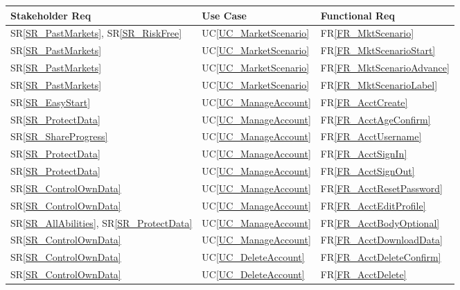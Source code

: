 \documentclass[12pt]{article}
\newcommand{\srref}[1]{SR\ref{#1}}
\newcommand{\ucref}[1]{UC\ref{#1}}
\newcommand{\rref}[1]{FR\ref{#1}}
\begin{document}
\begin{longtable}{p{} p{} p{}}

\toprule
Stakeholder Req & Use Case & Functional Req \\
\midrule

\srref{SR_PastMarkets}, \srref{SR_RiskFree} & \ucref{UC_MarketScenario} & \rref{FR_MktScenario} \\
\srref{SR_PastMarkets} & \ucref{UC_MarketScenario} & \rref{FR_MktScenarioStart} \\
\srref{SR_PastMarkets} & \ucref{UC_MarketScenario} & \rref{FR_MktScenarioAdvance} \\
\srref{SR_PastMarkets} & \ucref{UC_MarketScenario} & \rref{FR_MktScenarioLabel} \\
\srref{SR_EasyStart} & \ucref{UC_ManageAccount} & \rref{FR_AcctCreate} \\
\srref{SR_ProtectData} & \ucref{UC_ManageAccount} & \rref{FR_AcctAgeConfirm} \\
\srref{SR_ShareProgress} & \ucref{UC_ManageAccount} & \rref{FR_AcctUsername} \\
\srref{SR_ProtectData} & \ucref{UC_ManageAccount} & \rref{FR_AcctSignIn} \\
\srref{SR_ProtectData} & \ucref{UC_ManageAccount} & \rref{FR_AcctSignOut} \\
\srref{SR_ControlOwnData} & \ucref{UC_ManageAccount} & \rref{FR_AcctResetPassword} \\
\srref{SR_ControlOwnData} & \ucref{UC_ManageAccount} & \rref{FR_AcctEditProfile} \\
\srref{SR_AllAbilities}, \srref{SR_ProtectData} & \ucref{UC_ManageAccount} & \rref{FR_AcctBodyOptional} \\
\srref{SR_ControlOwnData} & \ucref{UC_ManageAccount} & \rref{FR_AcctDownloadData} \\
\srref{SR_ControlOwnData} & \ucref{UC_DeleteAccount} & \rref{FR_AcctDeleteConfirm} \\
\srref{SR_ControlOwnData} & \ucref{UC_DeleteAccount} & \rref{FR_AcctDelete} \\


\end{longtable}
\end{document}
